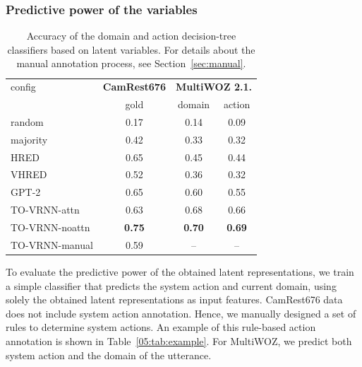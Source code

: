 \subsubsection{Predictive power of the variables}
\label{sec:pred_latents}
\begin{table}[tp]
    \centering\small
    \begin{tabular}{l|c|cc}
      \toprule
      config & \textbf{CamRest676} & \multicolumn{2}{c}{\textbf{MultiWOZ 2.1.}} \\
       & gold & domain & action \\
      \midrule
      random  & 0.17 & 0.14 & 0.09 \\
      majority &  0.42 & 0.33 & 0.32 \\\hdashline[0.5pt/2pt]
      HRED & 0.65 & 0.45 & 0.44 \\
      VHRED & 0.52 & 0.36 & 0.32 \\
      GPT-2 & 0.65 & 0.60 & 0.55 \\
      TO-VRNN-attn & 0.63 & 0.68 & 0.66 \\
      TO-VRNN-noattn & \textbf{0.75} &  \textbf{0.70} & \textbf{0.69} \\\hdashline[0.5pt/2pt]
      TO-VRNN-manual & 0.59 & -- & -- \\

      \bottomrule
  \end{tabular}
  \caption{Accuracy of the domain and action decision-tree classifiers based on latent variables. 
  For details about the manual annotation process, see Section~\ref{sec:manual}.}
  \label{tab:latent_classification}
\end{table}
To evaluate the predictive power of the obtained latent representations, we train a simple classifier that predicts the system action and current domain, using solely the obtained latent representations as input features.
CamRest676 data does not include system action annotation.
Hence, we manually designed a set of rules to determine system actions.
An example of this rule-based action annotation is shown in Table~\ref{05:tab:example}.
For MultiWOZ, we predict both system action and the domain of the utterance.

